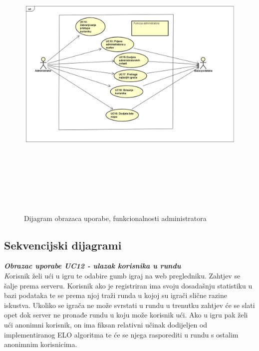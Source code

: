			    \begin{figure}[h]
			    	\centering
			    	\includegraphics[width=18.5cm,height=14.5cm]{useCaseDiagram2}
			    	\caption{Dijagram obrazaca uporabe, funkcionalnosti administratora}
			    	\label{fig:uc2}
			    \end{figure}
					
				\eject		
				
				
				\newpage
			\subsection{Sekvencijski dijagrami}

			
				\textbf{\textit{Obrazac uporabe UC12 - ulazak korisnika u rundu}}\\
				\textit Korisnik želi ući u igru te odabire gumb igraj na web pregledniku. Zahtjev se šalje prema serveru. Korisnik ako je registriran ima svoju dosadašnju statistiku u bazi podataka te se prema njoj traži runda u kojoj su igrači slične razine iskustva. Ukoliko se igrača ne može svrstati u rundu u trenutku zahtjev će se slati opet dok server ne pronađe rundu u koju može korisnik ući.
				Ako u igru pak želi ući anonimni korisnik, on ima fiksan relativni učinak dodijeljen od implementiranog ELO algoritma te će se njega rasporediti u rundu s ostalim anonimnim korisnicima.\\
				
